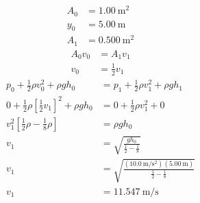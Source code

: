 \documentclass{article}
\begin{document}
\begin{align*}
	A_0 & = \SI{1.00}{\meter \squared} \\
	y_0 & = \SI{5.00}{\meter} \\
	A_1 & = \SI{0.500}{\meter \squared}
\end{align*}
\begin{align*}
	A_0v_0 & = A_1v_1 \\
	v_0 & = \frac{1}{2}v_1
\end{align*}
\begin{align*}
	p_0 + \frac{1}{2}\rho v_0^2 + \rho gh_0 & = p_1 + \frac{1}{2}\rho v_1^2 + \rho gh_1 \\
	0 + \frac{1}{2}\rho \left[ \frac{1}{2}v_1 \right]^2 + \rho gh_0 & = 0 + \frac{1}{2}\rho v_1^2 + 0 \\
	v_1^2 \left[ \frac{1}{2} \rho - \frac{1}{8}\rho \right] & = \rho gh_0 \\
	v_1 & = \sqrt{ \frac{ gh_0 }{ \frac{1}{2} - \frac{1}{8} } } \\
	v_1 & = \sqrt{ \frac{ (\SI{10.0}{\meter \per \second \squared})(\SI{5.00}{\meter}) }{ \frac{1}{2} - \frac{1}{8} } } \\
	v_1 & = \SI{11.547}{\meter \per \second}
\end{align*}
\end{document}
